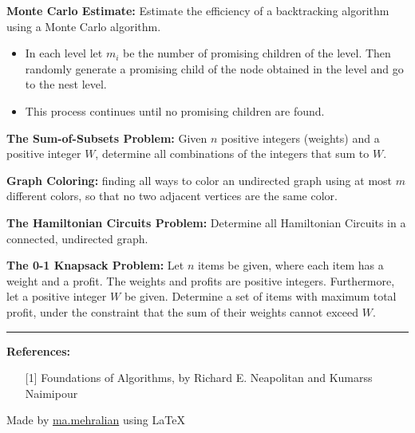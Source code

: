 \documentclass{../cheat}
\begin{document}
\begin{multicols}{3}
	\textbf{Monte Carlo Estimate:} Estimate the efficiency of a backtracking algorithm using a Monte Carlo algorithm.
	\begin{itemize}
		\item In each level let $m_i$ be the number of promising children of the level. Then randomly generate a promising child of the node obtained in the level and go to the nest level.
		\item This process continues until no promising children are found. 
	\end{itemize} 

	
	\textbf{The Sum-of-Subsets Problem:}
	Given $n$ positive integers (weights) and a positive integer $W$, determine all combinations of the integers that sum to $W$. 
	
	\textbf{Graph Coloring:}
	finding all ways to color an undirected graph using at most $m$ different colors, so that no two adjacent vertices are the same color.  
	
	\textbf{The Hamiltonian Circuits Problem:}
	Determine all Hamiltonian Circuits in a connected, undirected graph.
	
	\textbf{The 0-1 Knapsack Problem:}
	Let $n$ items be given, where each item has a weight and a profit. The weights and profits are positive integers. Furthermore, let a positive integer $W$ be given. Determine a set of items with maximum total profit, under the constraint that the sum of their weights cannot exceed $W$. 

	
	
\vspace{5mm}
\rule{0.3\linewidth}{0.25pt}
\scriptsize

\textbf{References:}
\begin{itemize}[leftmargin=2em]
	\item [{[1]}] Foundations of Algorithms, by Richard E. Neapolitan and Kumarss Naimipour 

\end{itemize}
Made by \href{http://webpages.iust.ac.ir/mehralian/}{ma.mehralian} using \LaTeX
\end{multicols}
\end{document}

